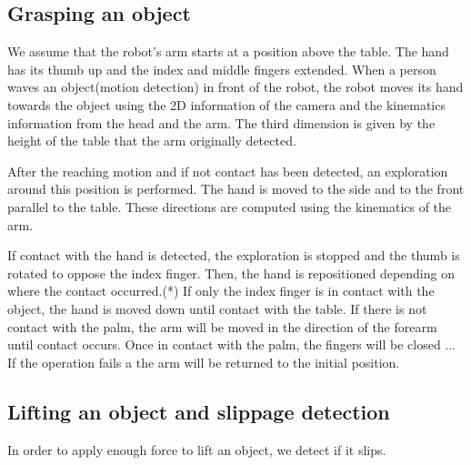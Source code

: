 
\subsection{Grasping an object}
\label{sec:impbehavior}


We assume that the robot's arm starts at a position above the
table. The hand has its thumb up and the index and middle fingers
extended. When a person waves an object(motion
detection\cite{kemp-thesis}) in front of the robot, the robot
moves its hand towards the object using the 2D information of the
camera and the kinematics information from the head and the arm.
The third dimension is given by the height of the table that the
arm originally detected.

After the reaching motion and if not contact has been detected, an
exploration around this position is performed. The hand is moved
to the side and to the front parallel to the table. These
directions are computed using the kinematics of the arm.

If contact with the hand is detected, the exploration is stopped
and the thumb is rotated to oppose the index finger. Then, the
hand is repositioned depending on where the contact occurred.(*)
If only the index finger is in contact with the object, the hand
is moved down until contact with the table.
%
If there is not contact with the palm, the arm will be moved in
the direction of the forearm until contact occurs.
%
Once in contact with the palm, the fingers will be closed ...
%
If the operation fails a the arm will be returned to the initial
position.

\subsection{Lifting an object and slippage detection}
In order to apply enough force to lift an object, we detect if it
slips.

